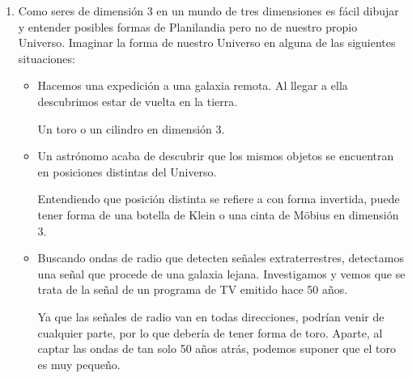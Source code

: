 \begin{enumerate}
\item Como seres de dimensión 3 en un mundo de tres dimensiones es fácil dibujar y entender posibles formas de Planilandia pero no de nuestro propio Universo. Imaginar la forma de nuestro Universo en alguna de las siguientes situaciones:

	\begin{itemize}
	\item Hacemos una expedición a una galaxia remota. Al llegar a ella descubrimos estar de vuelta en la tierra.
	
	Un toro o un cilindro en dimensión 3.
	
	\item Un astrónomo acaba de descubrir que los mismos objetos se encuentran en posiciones distintas del Universo.
	
	Entendiendo que posición distinta se refiere a con forma invertida, puede tener forma de una botella de Klein o una cinta de Möbius en dimensión 3.
	
	\item Buscando ondas de radio que detecten señales extraterrestres, detectamos una señal que procede de una galaxia lejana. Investigamos y vemos que se trata de la señal de un programa de TV emitido hace 50 años.
	
	Ya que las señales de radio van en todas direcciones, podrían venir de cualquier parte, por lo que debería de tener forma de toro. Aparte, al captar las ondas de tan solo 50 años atrás, podemos suponer que el toro es muy pequeño.
	
	\end{itemize}
\end{enumerate}

